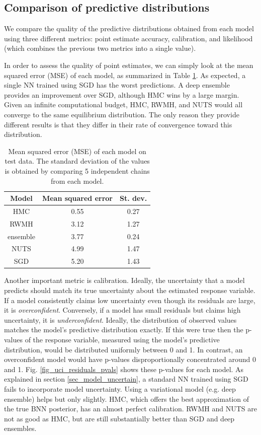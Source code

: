 \documentclass[12pt]{article}
\begin{document}
\subsection{Comparison of predictive distributions}

We compare the quality of the predictive distributions obtained from each model using three different metrics: point estimate accuracy, calibration, and likelihood (which combines the previous two metrics into a single value).

In order to assess the quality of point estimates, we can simply look at the mean squared error (MSE) of each model, as summarized in Table \ref{table_uci_mse}. As expected, a single NN trained using SGD has the worst predictions. A deep ensemble provides an improvement over SGD, although HMC wins by a large margin. Given an infinite computational budget, HMC, RWMH, and NUTS would all converge to the same equilibrium distribution. The only reason they provide different results is that they differ in their rate of convergence toward this distribution.
 
\begin{table}[H]
\centering
\begin{tabular}{|c|c|c|}
\hline
Model    & Mean squared error & St. dev. \\ \hline
HMC      & 0.55               & 0.27     \\ \hline
RWMH     & 3.12               & 1.27     \\ \hline
ensemble & 3.77               & 0.24     \\ \hline
NUTS     & 4.99               & 1.47     \\ \hline
SGD      & 5.20               & 1.43     \\ \hline
\end{tabular}
\caption{Mean squared error (MSE) of each model on test data. The standard deviation of the values is obtained by comparing 5 independent chains from each model.}
\label{table_uci_mse}
\end{table}

Another important metric is calibration. Ideally, the uncertainty that a model predicts should match its true uncertainty about the estimated response variable. If a model consistently claims low uncertainty even though its residuals are large, it is \textit{overconfident}. Conversely, if a model has small residuals but claims high uncertainty, it is \textit{underconfident}. Ideally, the distribution of observed values matches the model's predictive distribution exactly. If this were true then the p-values of the response variable, measured using the model's predictive distribution, would be distributed uniformly between 0 and 1. In contrast, an overconfident model would have p-values disproportionally concentrated around 0 and 1. Fig. \ref{fig_uci_residuals_pvals} shows these p-values for each model. As explained in section \ref{sec_model_uncertain}, a standard NN trained using SGD fails to incorporate model uncertainty. Using a variational model (e.g. deep ensemble) helps but only slightly. HMC, which offers the best approximation of the true BNN posterior, has an almost perfect calibration. RWMH and NUTS are not as good as HMC, but are still substantially better than SGD and deep ensembles.
\end{document}
